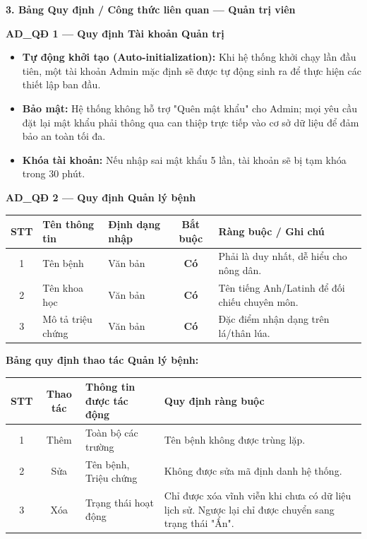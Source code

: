 \documentclass[12pt,a4paper]{article}
\begin{document}
\vspace{0.3cm}
\noindent \textbf{3. Bảng Quy định / Công thức liên quan --- Quản trị viên}

\vspace{0.2cm}
\noindent\textbf{AD\_QĐ 1 --- Quy định Tài khoản Quản trị}
\begin{itemize}
    \item \textbf{Tự động khởi tạo (Auto-initialization):} Khi hệ thống khởi chạy lần đầu tiên, một tài khoản Admin mặc định sẽ được tự động sinh ra để thực hiện các thiết lập ban đầu.
    \item \textbf{Bảo mật:} Hệ thống không hỗ trợ "Quên mật khẩu" cho Admin; mọi yêu cầu đặt lại mật khẩu phải thông qua can thiệp trực tiếp vào cơ sở dữ liệu để đảm bảo an toàn tối đa.
    \item \textbf{Khóa tài khoản:} Nếu nhập sai mật khẩu 5 lần, tài khoản sẽ bị tạm khóa trong 30 phút.
\end{itemize}

\vspace{0.4cm}
\noindent\textbf{AD\_QĐ 2 --- Quy định Quản lý bệnh}
\begin{longtable}{|c|l|p{2.5cm}|c|p{5cm}|}
\hline
\rowcolor{headerblue}
\textbf{STT} & \textbf{Tên thông tin} & \textbf{Định dạng nhập} & \textbf{Bắt buộc} & \textbf{Ràng buộc / Ghi chú} \\
\hline
\endhead
1 & Tên bệnh & Văn bản & \textbf{Có} & Phải là duy nhất, dễ hiểu cho nông dân. \\
\hline
2 & Tên khoa học & Văn bản & \textbf{Có} & Tên tiếng Anh/Latinh để đối chiếu chuyên môn. \\
\hline
3 & Mô tả triệu chứng & Văn bản & \textbf{Có} & Đặc điểm nhận dạng trên lá/thân lúa. \\
\hline
\end{longtable}
\noindent\textbf{Bảng quy định thao tác Quản lý bệnh:}
\begin{longtable}{|c|c|p{4cm}|p{6cm}|}
\hline
\rowcolor{headerblue}
\textbf{STT} & \textbf{Thao tác} & \textbf{Thông tin được tác động} & \textbf{Quy định ràng buộc} \\
\hline
1 & Thêm & Toàn bộ các trường & Tên bệnh không được trùng lặp. \\
\hline
2 & Sửa & Tên bệnh, Triệu chứng & Không được sửa mã định danh hệ thống. \\
\hline
3 & Xóa & Trạng thái hoạt động & Chỉ được xóa vĩnh viễn khi chưa có dữ liệu lịch sử. Ngược lại chỉ được chuyển sang trạng thái "Ẩn". \\
\hline
\end{longtable}
\end{document}
